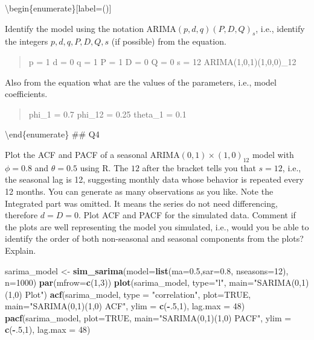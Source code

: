 \documentclass[
]{article}
\newenvironment{Shaded}{\begin{snugshade}}{\end{snugshade}}
\newcommand{\DataTypeTok}[1]{\textcolor[rgb]{0.13,0.29,0.53}{#1}}
\newcommand{\DecValTok}[1]{\textcolor[rgb]{0.00,0.00,0.81}{#1}}
\newcommand{\FloatTok}[1]{\textcolor[rgb]{0.00,0.00,0.81}{#1}}
\newcommand{\KeywordTok}[1]{\textcolor[rgb]{0.13,0.29,0.53}{\textbf{#1}}}
\newcommand{\NormalTok}[1]{#1}
\newcommand{\OperatorTok}[1]{\textcolor[rgb]{0.81,0.36,0.00}{\textbf{#1}}}
\newcommand{\OtherTok}[1]{\textcolor[rgb]{0.56,0.35,0.01}{#1}}
\newcommand{\StringTok}[1]{\textcolor[rgb]{0.31,0.60,0.02}{#1}}
\begin{document}
\textbackslash begin\{enumerate\}{[}label=(\alph*){]}

\item

Identify the model using the notation ARIMA\((p,d,q)(P,D,Q)_ s\), i.e.,
identify the integers \(p,d,q,P,D,Q,s\) (if possible) from the equation.

\begin{quote}
p = 1 d = 0 q = 1 P = 1 D = 0 Q = 0 s = 12 ARIMA(1,0,1)(1,0,0)\_12
\end{quote}

\item

Also from the equation what are the values of the parameters, i.e.,
model coefficients.

\begin{quote}
phi\_1 = 0.7 phi\_12 = 0.25 theta\_1 = 0.1
\end{quote}

\textbackslash end\{enumerate\} \#\# Q4

Plot the ACF and PACF of a seasonal ARIMA\((0, 1)\times(1, 0)_{12}\)
model with \(\phi =0 .8\) and \(\theta = 0.5\) using R. The \(12\) after
the bracket tells you that \(s=12\), i.e., the seasonal lag is 12,
suggesting monthly data whose behavior is repeated every 12 months. You
can generate as many observations as you like. Note the Integrated part
was omitted. It means the series do not need differencing, therefore
\(d=D=0\). Plot ACF and PACF for the simulated data. Comment if the
plots are well representing the model you simulated, i.e., would you be
able to identify the order of both non-seasonal and seasonal components
from the plots? Explain.

\begin{Shaded}
\begin{Highlighting}[]
\NormalTok{sarima_model <-}\StringTok{ }\KeywordTok{sim_sarima}\NormalTok{(}\DataTypeTok{model=}\KeywordTok{list}\NormalTok{(}\DataTypeTok{ma=}\FloatTok{0.5}\NormalTok{,}\DataTypeTok{sar=}\FloatTok{0.8}\NormalTok{, }\DataTypeTok{nseasons=}\DecValTok{12}\NormalTok{), }\DataTypeTok{n=}\DecValTok{1000}\NormalTok{)}
\KeywordTok{par}\NormalTok{(}\DataTypeTok{mfrow=}\KeywordTok{c}\NormalTok{(}\DecValTok{1}\NormalTok{,}\DecValTok{3}\NormalTok{))}
\KeywordTok{plot}\NormalTok{(sarima_model, }\DataTypeTok{type=}\StringTok{"l"}\NormalTok{, }\DataTypeTok{main=}\StringTok{"SARIMA(0,1)(1,0) Plot"}\NormalTok{)}
\KeywordTok{acf}\NormalTok{(sarima_model, }\DataTypeTok{type =} \StringTok{"correlation"}\NormalTok{, }\DataTypeTok{plot=}\OtherTok{TRUE}\NormalTok{, }\DataTypeTok{main=}\StringTok{"SARIMA(0,1)(1,0) ACF"}\NormalTok{, }\DataTypeTok{ylim =} \KeywordTok{c}\NormalTok{(}\OperatorTok{-}\NormalTok{.}\DecValTok{5}\NormalTok{,}\DecValTok{1}\NormalTok{), }\DataTypeTok{lag.max =} \DecValTok{48}\NormalTok{)}
\KeywordTok{pacf}\NormalTok{(sarima_model, }\DataTypeTok{plot=}\OtherTok{TRUE}\NormalTok{, }\DataTypeTok{main=}\StringTok{"SARIMA(0,1)(1,0) PACF"}\NormalTok{, }\DataTypeTok{ylim =} \KeywordTok{c}\NormalTok{(}\OperatorTok{-}\NormalTok{.}\DecValTok{5}\NormalTok{,}\DecValTok{1}\NormalTok{), }\DataTypeTok{lag.max =} \DecValTok{48}\NormalTok{)}
\end{Highlighting}
\end{Shaded}
\end{document}
